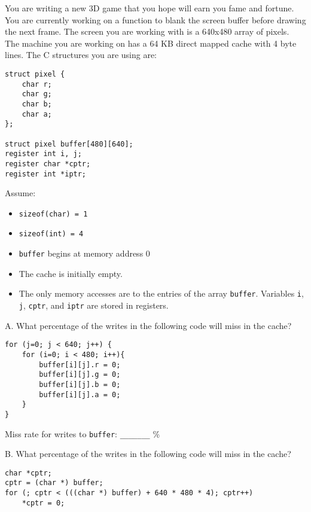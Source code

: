 \begin{problem}{8}

You are writing a new 3D game that you hope will earn you fame and
fortune.  You are currently working on a function to blank the screen
buffer before drawing the next frame.  The screen you are working with
is a 640x480 array of pixels. The machine you are working on has a
64 KB direct mapped cache with 4 byte lines. The C structures you are
using are:

\begin{verbatim}
struct pixel {
    char r;
    char g;
    char b;
    char a;
};

struct pixel buffer[480][640];
register int i, j;
register char *cptr;
register int *iptr;
\end{verbatim}

Assume:
\begin{itemize}
\item \verb|sizeof(char) = 1|
\item \verb|sizeof(int) = 4|
\item \verb|buffer| begins at memory address 0
\item The cache is initially empty.
\item The only memory accesses are to the entries of the array \verb|buffer|. 
Variables \verb|i|, \verb|j|, \verb|cptr|, and \verb|iptr| are stored in registers.
\end{itemize}

\end{problem}

\newpage

A. What percentage of the writes in the following code will miss in the cache?

\begin{verbatim}
for (j=0; j < 640; j++) {
    for (i=0; i < 480; i++){
        buffer[i][j].r = 0;
        buffer[i][j].g = 0;
        buffer[i][j].b = 0;
        buffer[i][j].a = 0;
    }
}
\end{verbatim}

\vspace{0.25in}

Miss rate for writes to {\tt buffer}: \verb|_______| \%

\vspace{0.25in}

B. What percentage of the writes in the following code will miss in the cache?

\begin{verbatim}
char *cptr;
cptr = (char *) buffer;
for (; cptr < (((char *) buffer) + 640 * 480 * 4); cptr++)
    *cptr = 0;
\end{verbatim}

